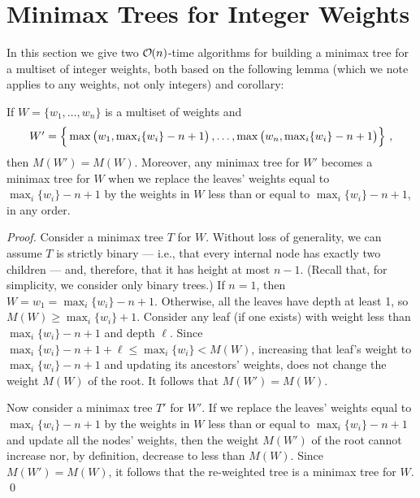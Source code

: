 \documentclass[runningheads]{llncs}
\newcommand{\Oh}[1]
    {\ensuremath{\mathcal{O} \hspace{-.5ex} \left( {#1} \right)}}
\begin{document}
\section{Minimax Trees for Integer Weights} \label{sec:ints}

In this section we give two $\Oh{n}$-time algorithms for building a minimax tree for a multiset of integer weights, both based on the following lemma (which we note applies to any weights, not only integers) and corollary:

\begin{lemma} \label{lem:replacement}
If \(W = \{w_1, \ldots, w_n\}\) is a multiset of weights and
\[\textstyle W'
= \left\{ \rule{0ex}{2.5ex}
    \max \left( \rule{0ex}{2ex} w_1, \max_i \{w_i\} - n + 1 \right), \ldots,
    \max \left( \rule{0ex}{2ex} w_n, \max_i \{w_i\} - n + 1 \right) \right\}\,,\]
then \(M (W') = M (W)\).  Moreover, any minimax tree for $W'$ becomes a minimax tree for $W$ when we replace the leaves' weights equal to \(\max_i \{w_i\} - n + 1\) by the weights in $W$ less than or equal to \(\max_i \{w_i\} - n + 1\), in any order.
\end{lemma}

\begin{proof}
Consider a minimax tree $T$ for $W$.  Without loss of generality, we can assume $T$ is strictly binary --- i.e., that every internal node has exactly two children --- and, therefore, that it has height at most \(n - 1\).  (Recall that, for simplicity, we consider only binary trees.)  If \(n = 1\), then \(W = w_1 = \max_i \{w_i\} - n + 1\).  Otherwise, all the leaves have depth at least 1, so \(M (W) \geq \max_i \{w_i\} + 1\).  Consider any leaf (if one exists) with weight less than \(\max_i \{w_i\} - n + 1\) and depth $\ell$.  Since \(\max_i \{w_i\} - n + 1 + \ell \leq \max_i \{w_i\} < M (W)\), increasing that leaf's weight to \(\max_i \{w_i\} - n + 1\) and updating its ancestors' weights, does not change the weight \(M (W)\) of the root.  It follows that \(M (W') = M (W)\).

Now consider a minimax tree $T'$ for $W'$.  If we replace the leaves' weights equal to \(\max_i \{w_i\} - n + 1\) by the weights in $W$ less than or equal to \(\max_i \{w_i\} - n + 1\) and update all the nodes' weights, then the weight \(M (W')\) of the root cannot increase nor, by definition, decrease to less than \(M (W)\).  Since \(M (W') = M (W)\), it follows that the re-weighted tree is a minimax tree for $W$. \qed
\end{proof}
\end{document}
